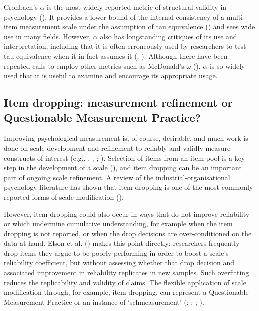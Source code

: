\documentclass[
  nonatbib,
  authoryear,
  preprint]{elsarticle}
\begin{document}
Cronbach's \(\alpha\) is the most widely reported metric of structural
validity in psychology (). It provides a lower bound of the internal consistency of a
multi-item measurement scale under the assumption of tau equivalence
() and sees wide
use in many fields. However, \(\alpha\) also has longstanding critiques
of its use and interpretation, including that it is often erroneously
used by researchers to test tau equivalence when it in fact assumes it
(;
). Although there have
been repeated calls to employ other metrics such as McDonald's
\(\omega\) (),
\(\alpha\) is so widely used that it is useful to examine and encourage
its appropriate usage.

\subsection{Item dropping: measurement refinement or Questionable
Measurement
Practice?}\label{item-dropping-measurement-refinement-or-questionable-measurement-practice}

Improving psychological measurement is, of course, desirable, and much
work is done on scale development and refinement to reliably and validly
measure constructs of interest (e.g.,
,
;
;
).
Selection of items from an item pool is a key step in the development of
a scale (),
and item dropping can be an important part of ongoing scale refinement.
A review of the industrial-organisational psychology literature has
shown that item dropping is one of the most commonly reported forms of
scale modification ().

However, item dropping could also occur in ways that do not improve
reliability or which undermine cumulative understanding, for example
when the item dropping is not reported, or when the drop decisions are
over-conditioned on the data at hand. Elson et al.
() makes this point
directly: researchers frequently drop items they argue to be poorly
performing in order to boost a scale's reliability coefficient, but
without assessing whether that drop decision and associated improvement
in reliability replicates in new samples. Such overfitting reduces the
replicability and validity of claims. The flexible application of scale
modification through, for example, item dropping, can represent a
Questionable Measurement Practice or an instance of `schmeasurement'
(;
;
;
).
\end{document}

